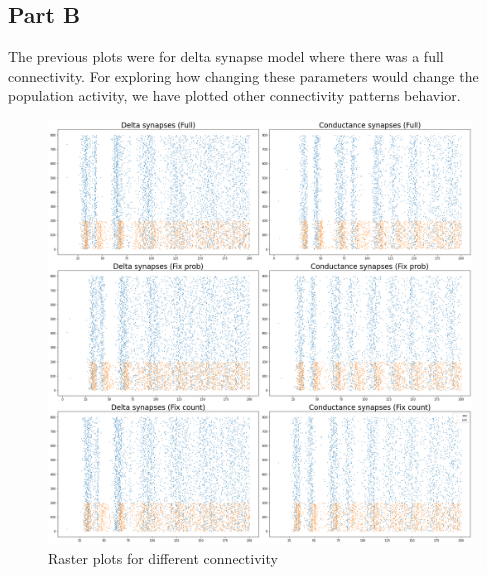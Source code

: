 \documentclass{article}
\begin{document}
	\subsection{Part B}
	The previous plots were for delta synapse model where there was a full connectivity. For exploring how changing these parameters would change the population activity, we have plotted other connectivity patterns behavior.\\
	
	\begin{figure}[h]
		\includegraphics[width=1.2\textwidth]{raster2.png}
		\caption{Raster plots for different connectivity}
		\label{raster2}
	\end{figure}
	
	
	
\end{document}
